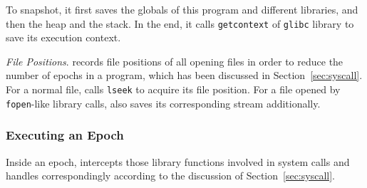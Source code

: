 To snapshot, it first saves the globals of this program and different libraries, 
and then the heap and the stack. 
In the end, it calls \texttt{getcontext} of \texttt{glibc} library to save its execution context.

{\em File Positions}. \doubletake{} records file positions of all opening files
in order to reduce the number of epochs in a program, 
which has been discussed in Section~\ref{sec:syscall}.
For a normal file, \doubletake{} calls \texttt{lseek} to acquire its file position.
For a file opened by \texttt{fopen}-like library calls,
\doubletake{} also saves its corresponding stream additionally.

\subsubsection{Executing an Epoch}
\label{sec:inepoch}
Inside an epoch, \doubletake{} intercepts those library functions involved in system calls 
and handles correspondingly according to the discussion of Section~\ref{sec:syscall}.

